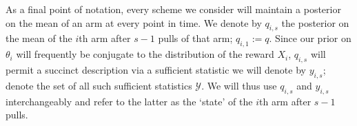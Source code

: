 As a final point of notation, every scheme we consider will maintain a posterior on the mean of an arm at every point in time. We denote by $q_{i,s}$ the posterior on the mean of the $i$th arm after $s-1$ pulls of that arm; $q_{i,1} := q$. Since our prior on $\theta_i$ will frequently be conjugate to the distribution of the reward $X_i$, $q_{i,s}$ will permit a succinct description via a sufficient statistic we will denote by $y_{i,s}$; denote the set of all such sufficient statistics $\mathcal{Y}$. We will thus use $q_{i,s}$ and $y_{i,s}$ interchangeably and refer to the latter as the `state' of the $i$th arm after $s-1$ pulls.  

